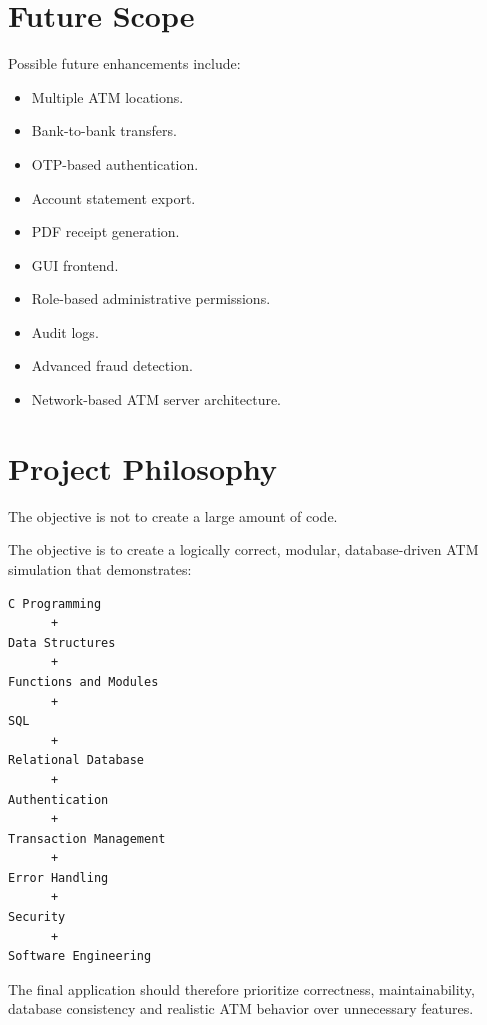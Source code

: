 \documentclass[12pt,a4paper]{article}
\begin{document}
\section{Future Scope}

Possible future enhancements include:

\begin{itemize}
    \item Multiple ATM locations.
    \item Bank-to-bank transfers.
    \item OTP-based authentication.
    \item Account statement export.
    \item PDF receipt generation.
    \item GUI frontend.
    \item Role-based administrative permissions.
    \item Audit logs.
    \item Advanced fraud detection.
    \item Network-based ATM server architecture.
\end{itemize}


\section{Project Philosophy}

The objective is not to create a large amount of code.

The objective is to create a logically correct, modular, database-driven
ATM simulation that demonstrates:

\begin{verbatim}
C Programming
      +
Data Structures
      +
Functions and Modules
      +
SQL
      +
Relational Database
      +
Authentication
      +
Transaction Management
      +
Error Handling
      +
Security
      +
Software Engineering
\end{verbatim}

The final application should therefore prioritize correctness,
maintainability, database consistency and realistic ATM behavior over
unnecessary features.
\end{document}
